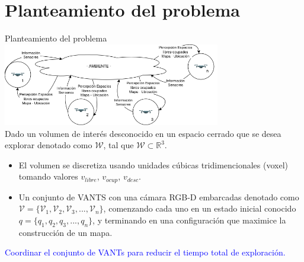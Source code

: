 \documentclass[
  24pt, %
  aspectratio=169, %
]{beamer}
\begin{document}
\section{Planteamiento del problema}
\begin{frame}{Planteamiento del problema}
  \vspace{2mm}
  \centering
  \includegraphics[width=9.5cm]{problema}\\
  \justifying
  \small Dado un volumen de interés desconocido en un espacio cerrado que se desea explorar denotado como $\mathcal{W}$, tal que $\mathcal{W} \subset \mathbb{R}^{3}$.\\
  \begin{itemize}
  \item El volumen se discretiza usando unidades cúbicas tridimencionales (voxel) tomando valores $v_{libre}$, $v_{ocup}$, $v_{desc}$.
  \item Un conjunto de VANTS con una cámara RGB-D embarcadas denotado como $\mathcal{V} = \{\mathcal{V}_{1},\mathcal{V}_{2},\mathcal{V}_{3},...,\mathcal{V}_{n}\}$, comenzando cada uno en un estado inicial conocido $q = \{q_{1},q_{2},q_{3},...,q_{n}\}$, y terminando en una configuración que maximice la construcción de un mapa.\\
  \end{itemize}
  
  \begin{center}
    \textcolor{blue}{Coordinar el conjunto de VANTs para reducir el tiempo total de exploración.}
  \end{center}
    

\end{frame}
\end{document}
